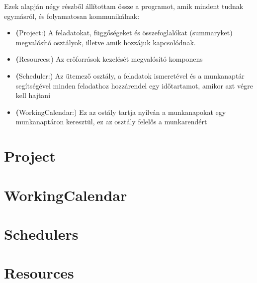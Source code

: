 Ezek alapján négy részből állítottam össze a programot, amik mindent tudnak egymásról, és folyamatosan kommunikálnak:
\begin{itemize}
	\item \textbf(Project:) A feladatokat, függőségeket és összefoglalókat (summaryket) megvalósító osztályok, illetve amik hozzájuk kapcsolódnak.
	\item \textbf(Resources:) Az erőforrások kezelését megvalósító komponens
	\item \textbf(Scheduler:) Az ütemező osztály, a feladatok ismeretével és a munkanaptár segítségével minden feladathoz hozzárendel egy időtartamot, amikor azt végre kell hajtani
	\item \textbf(WorkingCalendar:) Ez az ostály tartja nyilván a munkanapokat egy munkanaptáron keresztül, ez az osztály felelős a munkarendért
\end{itemize}

\section{Project}

\section{WorkingCalendar}

\section{Schedulers}

\section{Resources}
